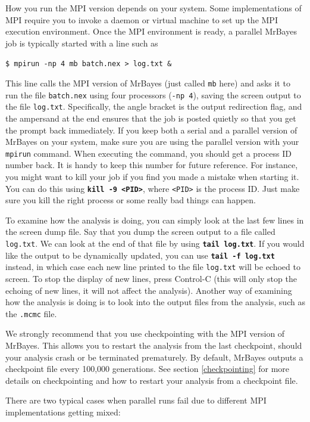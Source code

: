 \documentclass[12pt]{book}
\newcommand{\ttt}[1]{\texttt{#1}}
\newcommand{\tb}[1]{\ttt{\textbf{#1}}}
\begin{document}
How you run the MPI version depends on your system. Some implementations of MPI require you to
invoke a daemon or virtual machine to set up the MPI execution environment. Once the MPI
environment is ready, a parallel MrBayes job is typically started with a line such as

\ttt{\$ mpirun -np 4 mb batch.nex > log.txt \&}

This line calls the MPI version of MrBayes (just called \ttt{mb} here) and asks it to run the file
\ttt{batch.nex} using four processors (\ttt{-np 4}), saving the screen output to the file
\ttt{log.txt}. Specifically, the angle bracket is the output redirection flag, and the ampersand at
the end ensures that the job is posted quietly so that you get the prompt back immediately. If you
keep both a serial and a parallel version of MrBayes on your system, make sure you are using the
parallel version with your \ttt{mpirun} command. When executing the command, you should get a
process ID number back. It is handy to keep this number for future reference. For instance, you
might want to kill your job if you find you made a mistake when starting it. You can do this using
\tb{kill -9 <PID>}, where \ttt{<PID>} is the process ID. Just make sure you kill the right process
or some really bad things can happen.

To examine how the analysis is doing, you can simply look at the last few lines in the screen dump
file. Say that you dump the screen output to a file called \ttt{log.txt}. We can look at the end
of that file by using \tb{tail log.txt}. If you would like the output to be dynamically updated,
you can use \tb{tail -f log.txt} instead, in which case each new line printed to the file
\ttt{log.txt} will be echoed to screen. To stop the display of new lines, press Control-C (this
will only stop the echoing of new lines, it will not affect the analysis). Another way of examining
how the analysis is doing is to look into the output files from the analysis, such as the
\ttt{.mcmc} file.

We strongly recommend that you use checkpointing with the MPI version of MrBayes. This allows you
to restart the analysis from the last checkpoint, should your analysis crash or be terminated
prematurely. By default, MrBayes outputs a checkpoint file every 100,000 generations. See section
\ref{checkpointing} for more details on checkpointing and how to restart your analysis from a
checkpoint file.

There are two typical cases when parallel runs fail due to different MPI implementations getting
mixed:
\end{document}
